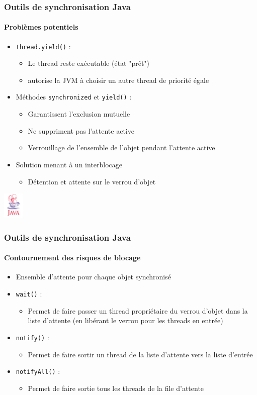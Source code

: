 \begin{frame}
\frametitle{Outils de synchronisation Java}
\framesubtitle{Problèmes potentiels}
\begin{itemize}
\item \texttt{thread.yield()} :
\begin{itemize}
\item Le thread reste exécutable (état "prêt")
\item autorise la JVM à choisir un autre thread de priorité égale
\end{itemize}
\item Méthodes \texttt{synchronized} et \texttt{yield()} :
\begin{itemize}
\item Garantissent l’exclusion mutuelle
\item Ne suppriment pas l’attente active
\item Verrouillage de l’ensemble de l’objet pendant l’attente active
\end{itemize}
\item Solution menant à un interblocage
\begin{itemize}
\item Détention et attente sur le verrou d'objet
\end{itemize}

\end{itemize}
\begin{flushright}
\includegraphics[width=1cm]{../illustration/java.png}
\end{flushright}
\end{frame}

\begin{frame}
\frametitle{Outils de synchronisation Java}
\framesubtitle{Contournement des risques de blocage}
\begin{itemize}
\item Ensemble d’attente pour chaque objet synchronisé
\item \texttt{wait()} :
\begin{itemize}
\item Permet de faire passer un thread propriétaire du verrou d’objet dans la liste d’attente (en libérant le verrou pour les threads en entrée)
\end{itemize}
\item \texttt{notify()} :
\begin{itemize}
\item Permet de faire sortir un thread de la liste d’attente vers la liste d’entrée
\end{itemize}
\item \texttt{notifyAll()} :
\begin{itemize}
\item Permet de faire sortie tous les threads de la file d’attente
\end{itemize}
\end{itemize}
\end{frame}

